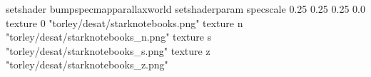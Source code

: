 setshader bumpspecmapparallaxworld
setshaderparam specscale 0.25 0.25 0.25 0.0
texture 0 "torley/desat/starknotebooks.png"
texture n "torley/desat/starknotebooks_n.png"
texture s "torley/desat/starknotebooks_s.png"
texture z "torley/desat/starknotebooks_z.png"

